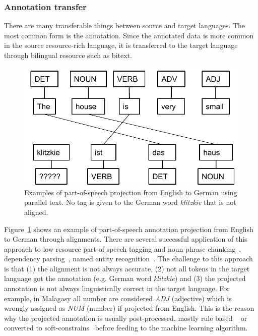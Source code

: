 \documentclass[12pt,twoside,final,hidelinks]{ltthesis}
\theoremstyle{definition}
\begin{document}
\subsubsection{Annotation transfer}
There are many transferable things between source and target languages. The most common 
form is the annotation. Since the annotated data is more common in the source resource-rich language, it is transferred to the target language through bilingual resource such as bitext.
\begin{figure}
\centering
\includegraphics[scale=0.5]{Figures/LabelProjection}
\caption[Part-of-speech projection examples]{Examples of part-of-speech projection from English to German using parallel text. No tag is given to the German word \textit{klitzkie} that is not aligned.}
\label{fig:projection_example_en_de}
\end{figure}
Figure~\ref{fig:projection_example_en_de} shows an example of part-of-speech annotation projection from English to German through alignments. 
There are several successful application of this approach to low-resource part-of-speech tagging and noun-phrase chunking~\cite{YarowskyAndNgai}, dependency parsing~\cite{Hwa:2005:BPV}, named entity recognition~\cite{wang-che-manning:2013:ACL2013}.
The challenge to this approach is that (1) the alignment is not always accurate, (2) not all 
tokens in the target language got the annotation (e.g. German word \textit{klitzkie}) and (3) 
the projected annotation is not always linguistically correct in the target language. For 
example, in Malagasy all number are considered \textit{ADJ} (adjective) which is wrongly assigned as \textit{NUM} (number) if projected from English. 
This is the reason why the projected annotation is usually post-processed, mostly rule based ~\cite{Hwa:2005:BPV} or converted to soft-constrains~\cite{Das:2011,TackstromDPMN13} before feeding to the machine learning algorithm. 
\end{document}
